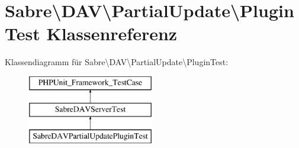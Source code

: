 \hypertarget{class_sabre_1_1_d_a_v_1_1_partial_update_1_1_plugin_test}{}\section{Sabre\textbackslash{}D\+AV\textbackslash{}Partial\+Update\textbackslash{}Plugin\+Test Klassenreferenz}
\label{class_sabre_1_1_d_a_v_1_1_partial_update_1_1_plugin_test}
Klassendiagramm für Sabre\textbackslash{}D\+AV\textbackslash{}Partial\+Update\textbackslash{}Plugin\+Test\+:\begin{figure}[H]
\begin{center}
\leavevmode
\includegraphics[height=3.000000cm]{class_sabre_1_1_d_a_v_1_1_partial_update_1_1_plugin_test}
\end{center}
\end{figure}
